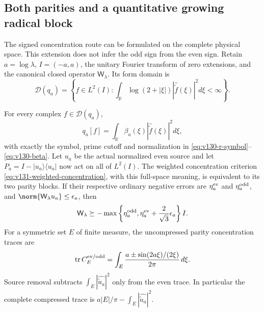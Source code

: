 \subsection*{Both parities and a quantitative growing radical block}

The signed concentration route can be formulated on the complete physical
space.  This extension does not infer the odd sign from the even sign.
Retain $a=\log\lambda$, $I=(-a,a)$, the unitary Fourier transform of
zero extensions, and the canonical closed operator $\mathsf W_\lambda$.
Its form domain is
\[
 \mathcal D(q_a)=\left\{f\in L^2(I):
 \int_{\mathbb R}\log(2+|\xi|)
       |\widehat{\widetilde f}(\xi)|^2d\xi<\infty\right\}.
\]

\begin{proposition}
\label{prop:v135-both-parities}
For every complex $f\in\mathcal D(q_a)$,
\begin{equation}\label{eq:v135-full-symbol}
 q_a[f]=\int_{\mathbb R}\beta_a(\xi)
                    |\widehat{\widetilde f}(\xi)|^2d\xi,
\end{equation}
with exactly the symbol, prime cutoff and normalization in
\eqref{eq:v130-r-symbol}--\eqref{eq:v130-beta}.
Let $u_a$ be the actual normalized even source and let
$P_a=I-|u_a\rangle\langle u_a|$ now act on all of $L^2(I)$.
The weighted concentration criterion
\eqref{eq:v131-weighted-concentration}, with this full-space meaning,
is equivalent to its two parity blocks.  If their respective ordinary
negative errors are $\eta_a^{\rm ev}$ and $\eta_a^{\rm odd}$, and
$\norm{\mathsf W_\lambda u_a}\le\epsilon_a$, then
\begin{equation}\label{eq:v135-full-error}
 \mathsf W_\lambda\succeq-
 \max\left\{\eta_a^{\rm odd},
      \eta_a^{\rm ev}+\frac2{\sqrt3}\epsilon_a\right\}I.
\end{equation}
For a symmetric set $E$ of finite measure, the uncompressed parity
concentration traces are
\begin{equation}\label{eq:v135-parity-traces}
 \operatorname{tr}C_E^{\rm ev/odd}
 =\int_E\frac{a\mathbin{\pm}\sin(2a\xi)/(2\xi)}{2\pi}\,d\xi.
\end{equation}
Source removal subtracts $\int_E|\widehat{\widetilde u_a}|^2$ only
from the even trace.  In particular the complete compressed trace is
$a|E|/\pi-\int_E|\widehat{\widetilde u_a}|^2$.
\end{proposition}
